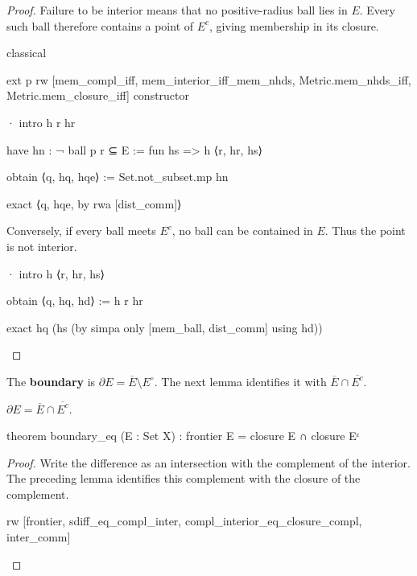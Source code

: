 \begin{proof}
  Failure to be interior means that no positive-radius ball lies in $E$.
  Every such ball therefore contains a point of $E^c$, giving membership in its closure.

  \begin{lean}
    classical

    ext p
    rw [mem_compl_iff, mem_interior_iff_mem_nhds, Metric.mem_nhds_iff,
      Metric.mem_closure_iff]
    constructor

    · intro h r hr

      have hn : ¬ ball p r ⊆ E := fun hs => h ⟨r, hr, hs⟩

      obtain ⟨q, hq, hqe⟩ := Set.not_subset.mp hn

      exact ⟨q, hqe, by rwa [dist_comm]⟩
  \end{lean}

  Conversely, if every ball meets $E^c$, no ball can be contained in $E$.
  Thus the point is not interior.

  \begin{lean}
    · intro h ⟨r, hr, hs⟩

      obtain ⟨q, hq, hd⟩ := h r hr

      exact hq (hs (by simpa only [mem_ball, dist_comm] using hd))
  \end{lean}
\end{proof}

\begin{definition}
  \label{ma:def:boundary}
  The \textbf{boundary} is $\partial E=\overline E\setminus E^{\circ}$.
  The next lemma identifies it with $\overline E\cap\overline{E^{c}}$.
\end{definition}

\begin{lemma}
  \label{ma:lem:boundary-eq}
  $\partial E=\overline E\cap\overline{E^{c}}$.

  \begin{lean}
    theorem boundary_eq (E : Set X) :
        frontier E = closure E ∩ closure Eᶜ
  \end{lean}
\end{lemma}

\begin{proof}
  Write the difference as an intersection with the complement of the interior.
  The preceding lemma identifies this complement with the closure of the complement.

  \begin{lean}
    rw [frontier, sdiff_eq_compl_inter, compl_interior_eq_closure_compl, inter_comm]
  \end{lean}

\end{proof}

